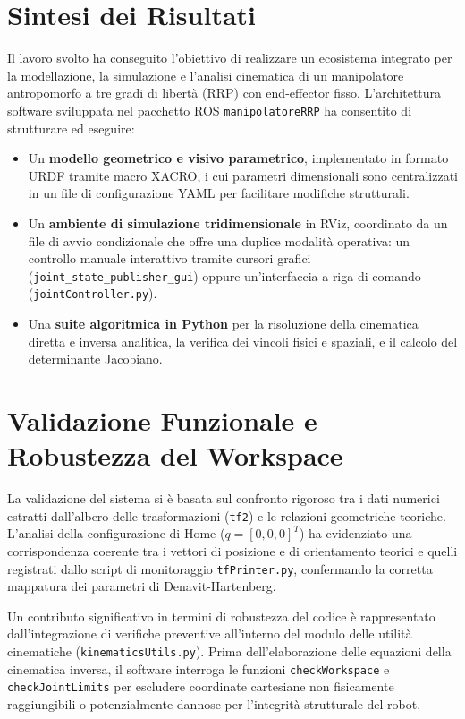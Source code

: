 \documentclass[11pt, a4paper]{report}
\begin{document}
\section{Sintesi dei Risultati}
Il lavoro svolto ha conseguito l'obiettivo di realizzare un ecosistema integrato per la modellazione, la simulazione e l'analisi cinematica di un manipolatore antropomorfo a tre gradi di libertà (RRP) con end-effector fisso. L'architettura software sviluppata nel pacchetto ROS \texttt{manipolatoreRRP} ha consentito di strutturare ed eseguire:
\begin{itemize}
    \item Un \textbf{modello geometrico e visivo parametrico}, implementato in formato URDF tramite macro XACRO, i cui parametri dimensionali sono centralizzati in un file di configurazione YAML per facilitare modifiche strutturali.
    \item Un \textbf{ambiente di simulazione tridimensionale} in RViz, coordinato da un file di avvio condizionale che offre una duplice modalità operativa: un controllo manuale interattivo tramite cursori grafici (\texttt{joint\_state\_publisher\_gui}) oppure un'interfaccia a riga di comando (\texttt{jointController.py}).
    \item Una \textbf{suite algoritmica in Python} per la risoluzione della cinematica diretta e inversa analitica, la verifica dei vincoli fisici e spaziali, e il calcolo del determinante Jacobiano.
\end{itemize}

\section{Validazione Funzionale e Robustezza del Workspace}
La validazione del sistema si è basata sul confronto rigoroso tra i dati numerici estratti dall'albero delle trasformazioni (\texttt{tf2}) e le relazioni geometriche teoriche. L'analisi della configurazione di Home (\(q = [0, 0, 0]^T\)) ha evidenziato una corrispondenza coerente tra i vettori di posizione e di orientamento teorici e quelli registrati dallo script di monitoraggio \texttt{tfPrinter.py}, confermando la corretta mappatura dei parametri di Denavit-Hartenberg.

Un contributo significativo in termini di robustezza del codice è rappresentato dall'integrazione di verifiche preventive all'interno del modulo delle utilità cinematiche (\texttt{kinematicsUtils.py}). Prima dell'elaborazione delle equazioni della cinematica inversa, il software interroga le funzioni \texttt{checkWorkspace} e \texttt{checkJointLimits} per escludere coordinate cartesiane non fisicamente raggiungibili o potenzialmente dannose per l'integrità strutturale del robot.
\end{document}
